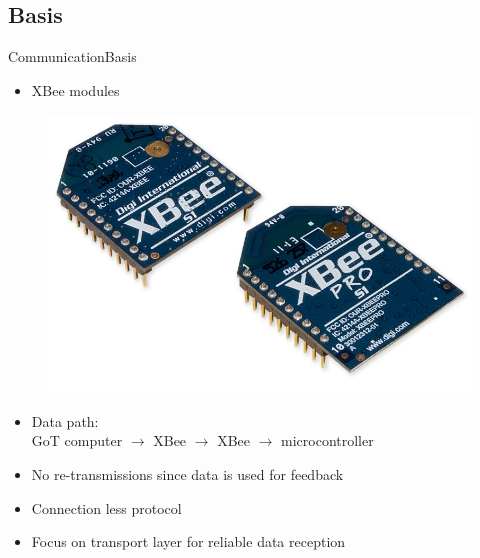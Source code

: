 \subsection{Basis}
\begin{frame}{Communication}{Basis}

  \begin{itemize}
    \item XBee modules
  \end{itemize}
  
  \begin{figure}
    	\includegraphics[scale = .1]{Pictures/Xbee.jpg}
  \end{figure}
  \vspace{-.2cm}
  \begin{itemize}
    \item Data path:\\GoT computer $\rightarrow$ XBee $\rightarrow$ XBee $\rightarrow$ microcontroller
    \item No re-transmissions since data is used for feedback 
    \item Connection less protocol
    \item Focus on transport layer for reliable data reception
  \end{itemize}
  
\end{frame}


